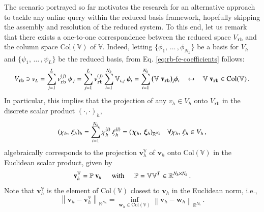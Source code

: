 \documentclass{elsarticle}
\numberwithin{equation}{section}
\theoremstyle{theorem}
\theoremstyle{definition}
\theoremstyle{remark}
\theoremstyle{proposition}
\numberwithin{figure}{section}
\newcommand{\norm}[1]{\left\lVert#1\right\rVert}
\newcommand{\bg}[1]{\boldsymbol{#1}}
\begin{document}
		The scenario portrayed so far motivates the research for an alternative approach to tackle any online query within the reduced basis framework, hopefully skipping the assembly and resolution of the reduced system. To this end, let us remark that there exists a one-to-one correspondence between the reduced space $V_{\texttt{rb}}$ and the column space $\text{Col}(\mathbb{V})$ of $\mathbb{V}$. Indeed, letting $\big\lbrace \phi_1, \, \ldots \, , \phi_{N_h} \big\rbrace$ be a basis for $V_h$ and $\big\lbrace \psi_1, \, \ldots \, , \psi_L \big\rbrace$ be the reduced basis, from Eq. \eqref{eq:rb-fe-coefficients} follows:
		\begin{equation*}
			V_{\texttt{rb}} \ni v_{L} = \sum_{j = 1}^L v_{\texttt{rb}}^{(j)} ~ \psi_j = \sum_{j = 1}^L v_{\texttt{rb}}^{(j)} \sum_{i = 1}^{N_h} \mathbb{V}_{i,j} ~ \phi_i = \sum_{i = 1}^{N_h} \big( \mathbb{V} ~ \mathbf{v}_{\texttt{rb}} \big)_i \phi_i \hspace*{0.3cm} \leftrightarrow \hspace*{0.3cm} \mathbb{V} ~ \mathbf{v}_{\texttt{rb}} \in \text{Col}(\mathbb{V}) \, .
		\end{equation*} 
		In particular, this implies that the projection of any $v_h \in V_h$ onto $V_{\texttt{rb}}$ in the discrete scalar product $(\cdot,\cdot)_h$, 
		\begin{equation}
			\label{eq:discrete-scalar-product}
			(\chi_h, \, \xi_h)_h = \sum_{i = 1}^{N_h} \chi_h^{(i)} ~ \xi_h^{(i)} = (\bg{\chi}_h, \, \bg{\xi}_h)_{\mathbb{R}^{N_h}} \hspace*{0.3cm} \text{$\forall \chi_h, \, \xi_h \in V_h$} \, , 
		\end{equation}
		algebraically corresponds to the projection $\mathbf{v}_h^{\mathbb{V}}$ of $\mathbf{v}_h$ onto $\text{Col}(\mathbb{V})$ in the Euclidean scalar product, given by
		\begin{equation*}
			\mathbf{v}_h^{\mathbb{V}} = \mathbb{P} ~ \mathbf{v}_h \hspace*{0.5cm} \text{with} \hspace*{0.5cm} \mathbb{P} = \mathbb{V} \mathbb{V}^T \in \mathbb{R}^{{N_h} \times {N_h}} \, .
		\end{equation*}
		Note that $\mathbf{v}_h^{\mathbb{V}}$ is the element of $\text{Col}(\mathbb{V})$ closest to $\mathbf{v}_h$ in the Euclidean norm, i.e.,
		\begin{equation*}
			\norm{\mathbf{v}_h - \mathbf{v}_h^{\mathbb{V}}}_{\mathbb{R}^{N_h}} = \inf_{\mathbf{w}_h \in \text{Col}(\mathbb{V})} \norm{\mathbf{v}_h - \mathbf{w}_h}_{\mathbb{R}^{N_h}} \, .
		\end{equation*}
\end{document}
